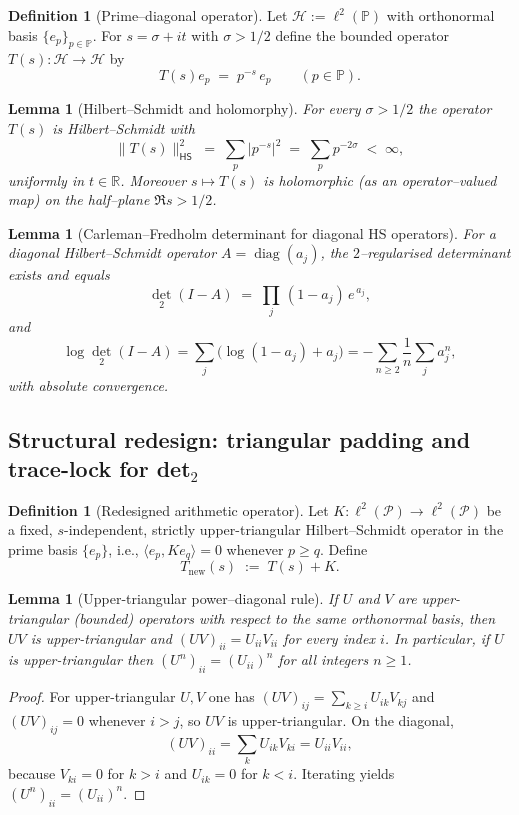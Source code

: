 \documentclass[11pt]{article}
\newtheorem{lemma}[theorem]{Lemma}
\theoremstyle{definition}
\newtheorem{definition}[theorem]{Definition}
\theoremstyle{remark}
\newcommand{\PP}{\mathcal{P}}
\begin{document}
\begin{definition}[Prime--diagonal operator]\label{def:T}
Let $\mathcal H:=\ell^{2}(\mathbb P)$ with orthonormal basis $\{e_{p}\}_{p\in\mathbb P}$. For $s=\sigma+it$ with $\sigma>1/2$ define the bounded operator $T(s):\mathcal H\to\mathcal H$ by
\[
  T(s)e_{p} \;=\; p^{-s}\,e_{p}\qquad(p\in\mathbb P).
\]
\end{definition}

\begin{lemma}[Hilbert--Schmidt and holomorphy]\label{lem:HS}
For every $\sigma>1/2$ the operator $T(s)$ is Hilbert--Schmidt with
\[
  \|T(s)\|_{\mathsf{HS}}^{2}
  \;=\;\sum_{p} |p^{-s}|^{2}
  \;=\;\sum_{p} p^{-2\sigma}
  \;<\;\infty,
\]
uniformly in $t\in\mathbb R$. Moreover $s\mapsto T(s)$ is holomorphic (as an operator--valued map) on the half--plane $\Re s>1/2$.
\end{lemma}

\begin{lemma}[Carleman--Fredholm determinant for diagonal HS operators]\label{lem:det2diag}
For a diagonal Hilbert--Schmidt operator $A=\operatorname{diag}(a_{j})$, the $2$--regularised determinant exists and equals
\[
  \det_{2}(I-A)\;=\;\prod_{j}\,(1-a_{j})\,e^{\,a_{j}},
\]
and
\[
  \log \det_{2}(I-A)
  = \sum_{j}\bigl(\log(1-a_{j})+a_{j}\big)
  = -\sum_{n\ge2}\frac{1}{n}\sum_{j} a_{j}^{n},
\]
with absolute convergence.\cite{SimonTraceIdeals}
\end{lemma}


\subsection*{Structural redesign: triangular padding and trace-lock for det$_2$}
\begin{definition}[Redesigned arithmetic operator]\label{def:Tnew}
Let $K:\ell^2(\PP)\to\ell^2(\PP)$ be a fixed, $s$-independent, strictly upper-triangular Hilbert--Schmidt operator in the prime basis $\{e_p\}$, i.e., $\langle e_p,Ke_q\rangle=0$ whenever $p\ge q$. Define
\[
  T_{\mathrm{new}}(s)\;:=\;T(s)+K.
\]
\end{definition}

\begin{lemma}[Upper-triangular power--diagonal rule]\label{lem:triang-power}
If $U$ and $V$ are upper-triangular (bounded) operators with respect to the same orthonormal basis, then $UV$ is upper-triangular and $(UV)_{ii}=U_{ii}V_{ii}$ for every index $i$. In particular, if $U$ is upper-triangular then $(U^n)_{ii}=(U_{ii})^n$ for all integers $n\ge 1$.
\end{lemma}
\begin{proof}
For upper-triangular $U,V$ one has $(UV)_{ij}=\sum_{k\ge i}U_{ik}V_{kj}$ and $(UV)_{ij}=0$ whenever $i>j$, so $UV$ is upper-triangular. On the diagonal,
\[
  (UV)_{ii}=\sum_{k}U_{ik}V_{ki}=U_{ii}V_{ii},
\]
because $V_{ki}=0$ for $k>i$ and $U_{ik}=0$ for $k<i$. Iterating yields $(U^n)_{ii}=(U_{ii})^n$.
\end{proof}
\end{document}

